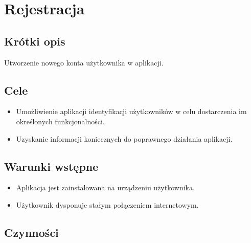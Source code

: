 \documentclass[licencjacka]{pracamgr}
\begin{document}
\section{Rejestracja}
    \subsection{Krótki opis}
    Utworzenie nowego konta użytkownika w aplikacji.
    \subsection{Cele}
    \begin{itemize}
    \item Umożliwienie aplikacji identyfikacji użytkowników w celu dostarczenia im określonych funkcjonalności.
    \item Uzyskanie informacji koniecznych do poprawnego działania aplikacji.
    \end{itemize}
    \subsection{Warunki wstępne}
    \begin{itemize}
        \item Aplikacja jest zainstalowana na urządzeniu użytkownika.
        \item Użytkownik dysponuje stałym połączeniem internetowym.
    \end{itemize}
    \subsection{Czynności}
\end{document}
